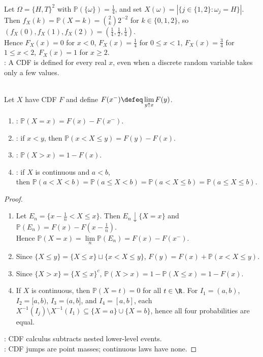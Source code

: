 \begin{example} \label{ex:two-coin-count-random-variable} \\
Let $\Omega=\{H,T\}^2$ with $\mathbb{P}(\{\omega\})=\frac{1}{4}$, and set $X(\omega)=|\{j\in\{1,2\}:\omega_j=H\}|$.\\
Then $f_X(k)=\mathbb{P}(X=k)=\binom{2}{k}2^{-2}$ for $k\in\{0,1,2\}$, so $(f_X(0),f_X(1),f_X(2))=(\frac{1}{4},\frac{1}{2},\frac{1}{4})$.\\
Hence $F_X(x)=0$ for $x<0$, $F_X(x)=\frac{1}{4}$ for $0\leq x<1$, $F_X(x)=\frac{3}{4}$ for $1\leq x<2$, $F_X(x)=1$ for $x\geq2$.\\
: A CDF is defined for every real $x$, even when a discrete random variable takes only a few values.
\end{example}

\begin{proposition} \label{prop:cdf-probability-calculus} \\
Let $X$ have CDF $F$ and define $F(x^-)\defeq\lim\limits_{y\uparrow x}F(y)$.
\begin{enumerate}[label=(\roman*)]
\setlength{\itemsep}{0pt}
\item {}: $\mathbb{P}(X=x)=F(x)-F(x^-)$.
\item {}: if $x<y$, then $\mathbb{P}(x<X\leq y)=F(y)-F(x)$.
\item {}: $\mathbb{P}(X>x)=1-F(x)$.
\item {}: if $X$ is continuous and $a<b$,\\
then $\mathbb{P}(a<X<b)=\mathbb{P}(a\leq X<b)=\mathbb{P}(a<X\leq b)=\mathbb{P}(a\leq X\leq b)$.
\end{enumerate}
\begin{proof}
\begin{enumerate}[label=(\roman*)]
\setlength{\itemsep}{0pt}
\item Let $E_n=\{x-\frac{1}{n}<X\leq x\}$. Then $E_n\downarrow\{X=x\}$ and $\mathbb{P}(E_n)=F(x)-F(x-\frac{1}{n})$.\\
Hence $\mathbb{P}(X=x)=\lim\limits_n\mathbb{P}(E_n)=F(x)-F(x^-)$.
\item Since $\{X\leq y\}=\{X\leq x\}\sqcup\{x<X\leq y\}$, $F(y)=F(x)+\mathbb{P}(x<X\leq y)$.
\item Since $\{X>x\}=\{X\leq x\}^c$, $\mathbb{P}(X>x)=1-\mathbb{P}(X\leq x)=1-F(x)$.
\item If $X$ is continuous, then $\mathbb{P}(X=t)=0$ for all $t\in\R$. For $I_1=(a,b)$, $I_2=[a,b)$, $I_3=(a,b]$, and $I_4=[a,b]$, each $X^{-1}(I_j)\setminus X^{-1}(I_1)\subseteq\{X=a\}\cup\{X=b\}$, hence all four probabilities are equal.
\end{enumerate}
: CDF calculus subtracts nested lower-level events.\\
: CDF jumps are point masses; continuous laws have none.
\end{proof}
\end{proposition}

